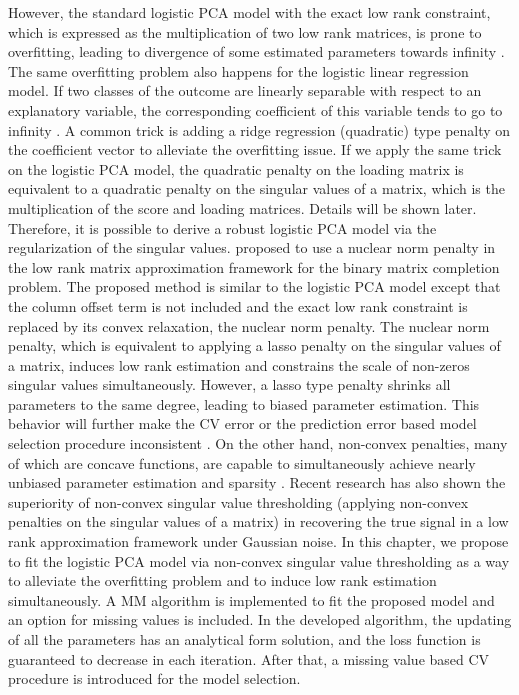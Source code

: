 However, the standard logistic PCA model with the exact low rank constraint, which is expressed as the multiplication of two low rank matrices, is prone to overfitting, leading to divergence of some estimated parameters towards infinity \cite{de2006principal, groenen2016multinomial}. The same overfitting problem also happens for the logistic linear regression model. If two classes of the outcome are linearly separable with respect to an explanatory variable, the corresponding coefficient of this variable tends to go to infinity \cite{agresti2013categorical}. A common trick is adding a ridge regression (quadratic) type penalty on the coefficient vector to alleviate the overfitting issue. If we apply the same trick on the logistic PCA model, the quadratic penalty on the loading matrix is equivalent to a quadratic penalty on the singular values of a matrix, which is the multiplication of the score and loading matrices. Details will be shown later. Therefore, it is possible to derive a robust logistic PCA model via the regularization of the singular values. \cite{davenport20141} proposed to use a nuclear norm penalty in the low rank matrix approximation framework for the binary matrix completion problem. The proposed method is similar to the logistic PCA model except that the column offset term is not included and the exact low rank constraint is replaced by its convex relaxation, the nuclear norm penalty. The nuclear norm penalty, which is equivalent to applying a lasso penalty on the singular values of a matrix, induces low rank estimation and constrains the scale of non-zeros singular values simultaneously. However, a lasso type penalty shrinks all parameters to the same degree, leading to biased parameter estimation. This behavior will further make the CV error or the prediction error based model selection procedure inconsistent \cite{meinshausen2010stability}. On the other hand, non-convex penalties, many of which are concave functions, are capable to simultaneously achieve nearly unbiased parameter estimation and sparsity \cite{fan2001variable,armagan2013generalized}. Recent research \cite{shabalin2013reconstruction, josse2016adaptive} has also shown the superiority of non-convex singular value thresholding (applying non-convex penalties on the singular values of a matrix) in recovering the true signal in a low rank approximation framework under Gaussian noise. In this chapter, we propose to fit the logistic PCA model via non-convex singular value thresholding as a way to alleviate the overfitting problem and to induce low rank estimation simultaneously. A MM algorithm is implemented to fit the proposed model and an option for missing values is included. In the developed algorithm, the updating of all the parameters has an analytical form solution, and the loss function is guaranteed to decrease in each iteration. After that, a missing value based CV procedure is introduced for the model selection.

